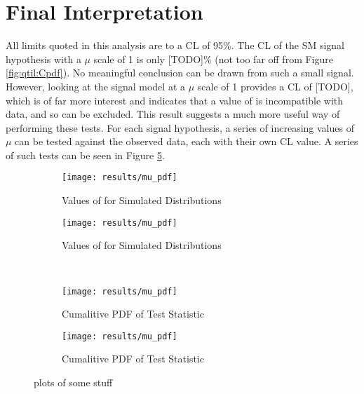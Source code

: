\section{Final Interpretation}

    All limits quoted in this analysis are to a CL of 95\%.
    The CL of the SM signal hypothesis with a $\mu$ scale of 1 is only [TODO]\%
        (not too far off from Figure \ref{fig:qtil:Cpdf}).
    No meaningful conclusion can be drawn from such a small signal.
    However, looking at the  signal model at a $\mu$ scale of 1 provides a CL of [TODO],
        which is of far more interest and indicates that a value of  is incompatible with data,
        and so can be excluded.
    This result suggests a much more useful way of performing these tests.
    For each signal hypothesis, a series of increasing values of $\mu$ can be tested against the observed data,
        each with their own CL value.
    A series of such tests can be seen in Figure \ref{fig:mu_CL_vals}.

    \begin{figure} %
        \centering
        \begin{subfigure}{0.48\textwidth} 
            \texttt{[image: results/mu\_pdf]}
            \caption{Values of \qtil for Simulated Distributions}
            \label{fig:mu_CL_k2v0}
        \end{subfigure}
        \begin{subfigure}{0.48\textwidth} 
            \texttt{[image: results/mu\_pdf]}
            \caption{Values of \qtil for Simulated Distributions}
            \label{fig:mu_CL_k2v1}
        \end{subfigure} \\
        \begin{subfigure}{0.48\textwidth}
            \texttt{[image: results/mu\_pdf]}
            \caption{Cumalitive PDF of \qtil Test Statistic}
            \label{fig:mu_CL_k2v1.5}
        \end{subfigure}
        \begin{subfigure}{0.48\textwidth}
            \texttt{[image: results/mu\_pdf]}
            \caption{Cumalitive PDF of \qtil Test Statistic}
            \label{fig:mu_CL_k2v3}
        \end{subfigure}
        \caption{
            plots of some stuff
        }\label{fig:mu_CL_vals}
    \end{figure}


